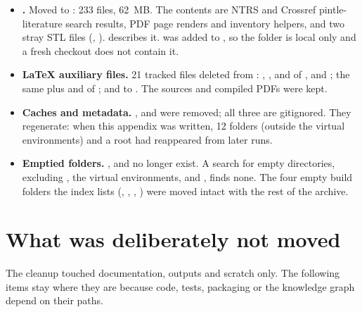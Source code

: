 \begin{itemize}
  \item \textbf{.} Moved to : 233 files, 62~MB. The contents are NTRS and Crossref pintle-literature search results, PDF page renders and inventory helpers, and two stray STL files (, ).  describes it.  was added to , so the folder is local only and a fresh checkout does not contain it.
  \item \textbf{LaTeX auxiliary files.} 21 tracked files deleted from : , ,  and  of ,  and ; the same plus  and  of ; and  to . The  sources and compiled PDFs were kept.
  \item \textbf{Caches and metadata.} ,  and  were removed; all three are gitignored. They regenerate: when this appendix was written, 12  folders (outside the virtual environments) and a root  had reappeared from later runs.
  \item \textbf{Emptied folders.} ,  and  no longer exist. A search for empty directories, excluding , the virtual environments,  and , finds none. The four empty build folders the index lists (, , , ) were moved intact with the rest of the archive.
\end{itemize}

\section{What was deliberately not moved}\label{sec:cl-notmoved}

The cleanup touched documentation, outputs and scratch only. The following items stay where they are because code, tests, packaging or the knowledge graph depend on their paths.

